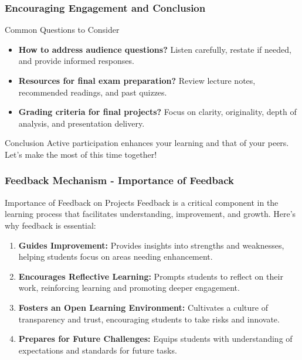\documentclass[aspectratio=169]{beamer}
\begin{document}
\begin{frame}[fragile]
    \frametitle{Encouraging Engagement and Conclusion}
    \begin{block}{Common Questions to Consider}
        \begin{itemize}
            \item \textbf{How to address audience questions?} Listen carefully, restate if needed, and provide informed responses.
            \item \textbf{Resources for final exam preparation?} Review lecture notes, recommended readings, and past quizzes.
            \item \textbf{Grading criteria for final projects?} Focus on clarity, originality, depth of analysis, and presentation delivery.
        \end{itemize}
    \end{block}
    
    \begin{block}{Conclusion}
        Active participation enhances your learning and that of your peers. Let’s make the most of this time together!
    \end{block}
\end{frame}

\begin{frame}[fragile]
    \frametitle{Feedback Mechanism - Importance of Feedback}
    \begin{block}{Importance of Feedback on Projects}
        Feedback is a critical component in the learning process that facilitates understanding, improvement, and growth. Here’s why feedback is essential:
    \end{block}
    \begin{enumerate}
        \item \textbf{Guides Improvement:} Provides insights into strengths and weaknesses, helping students focus on areas needing enhancement.
        
        \item \textbf{Encourages Reflective Learning:} Prompts students to reflect on their work, reinforcing learning and promoting deeper engagement.
        
        \item \textbf{Fosters an Open Learning Environment:} Cultivates a culture of transparency and trust, encouraging students to take risks and innovate.
        
        \item \textbf{Prepares for Future Challenges:} Equips students with understanding of expectations and standards for future tasks.
    \end{enumerate}
\end{frame}
\end{document}
